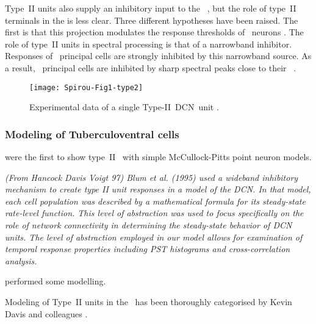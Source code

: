 
Type~II units also supply an inhibitory input to the
\VCN~\citep{WickesbergOertel:1990}, but the role of type~II terminals in the
\VCN is less clear. Three different hypotheses have been raised. The ﬁrst is
that this projection modulates the response thresholds of \VCN~neurons
\citep{PaoliniClark:1998}.  The role of type~II units in spectral processing is
that of a narrowband inhibitor. Responses of \DCN~principal cells are strongly
inhibited by this narrowband source. As a result, \DCN~principal cells are
inhibited by sharp spectral peaks close to their
\BF~\citep{SpirouDavisEtAl:1999}.


\begin{figure}[htb]
  \centering
  \texttt{[image: Spirou-Fig1-type2]}
  \caption[Experimental data of a single Type-II~DCN~unit]{Experimental data of
    a single Type-II~DCN~unit \citep[Fig.~1]{SpirouDavisEtAl:1999}.}
  \label{fig:SpirouFig1}
\end{figure}


\subsubsection{Modeling of Tuberculoventral cells}


\citet{ArleKim:1991a} were the first to show type~II \EIRA~with simple
McCullock-Pitts point neuron models.


{\it (From Hancock Davis Voigt 97) Blum et al. (1995) used a wideband inhibitory
  mechanism to create type II unit responses in a model of the DCN. In that
  model, each cell population was described by a mathematical formula for its
  steady-state rate-level function. This level of abstraction was used to focus
  specifically on the role of network connectivity in determining the
  steady-state behavior of DCN units. The level of abstraction employed in our
  model allows for examination of temporal response properties including PST
  histograms and cross-correlation analysis.}

\citep{DunnVetterEtAl:1996} performed some modelling.


Modeling of Type~II units in the \DCN~has been thoroughly categorised by Kevin
Davis and colleagues \citep{YoungDavis:2002,HancockDavisEtAl:2001,DavisYoung:2000,SpirouDavisEtAl:1999,HancockDavisEtAl:1997,DavisVoigt:1996,DavisVoigt:1994,DavisVoigt:1991}.

